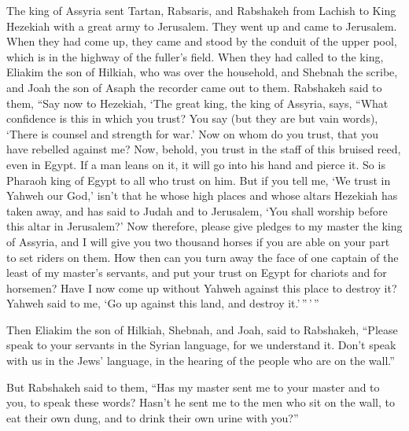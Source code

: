 \begin{paracol}{2}
\begin{otherlanguage}{english}
 The king of Assyria sent Tartan, Rabsaris, and Rabshakeh
from Lachish to King Hezekiah with a great army to Jerusalem. They went
up and came to Jerusalem. When they had come up, they came and stood by
the conduit of the upper pool, which is in the highway of the fuller's
field.  When they had called to the king, Eliakim the son
of Hilkiah, who was over the household, and Shebnah the scribe, and Joah
the son of Asaph the recorder came out to them. 
Rabshakeh said to them, ``Say now to Hezekiah, `The great king, the king
of Assyria, says, ``What confidence is this in which you trust?
 You say (but they are but vain words), `There is counsel
and strength for war.' Now on whom do you trust, that you have rebelled
against me?  Now, behold, you trust in the staff of this
bruised reed, even in Egypt. If a man leans on it, it will go into his
hand and pierce it. So is Pharaoh king of Egypt to all who trust on him.
 But if you tell me, `We trust in Yahweh our God,' isn't
that he whose high places and whose altars Hezekiah has taken away, and
has said to Judah and to Jerusalem, `You shall worship before this altar
in Jerusalem?'  Now therefore, please give pledges to my
master the king of Assyria, and I will give you two thousand horses if
you are able on your part to set riders on them.  How
then can you turn away the face of one captain of the least of my
master's servants, and put your trust on Egypt for chariots and for
horsemen?  Have I now come up without Yahweh against this
place to destroy it? Yahweh said to me, `Go up against this land, and
destroy it.'\,''\,'\,''

 Then Eliakim the son of Hilkiah, Shebnah, and Joah, said
to Rabshakeh, ``Please speak to your servants in the Syrian language,
for we understand it. Don't speak with us in the Jews' language, in the
hearing of the people who are on the wall.''

 But Rabshakeh said to them, ``Has my master sent me to
your master and to you, to speak these words? Hasn't he sent me to the
men who sit on the wall, to eat their own dung, and to drink their own
urine with you?''


\end{otherlanguage}
\end{paracol}
